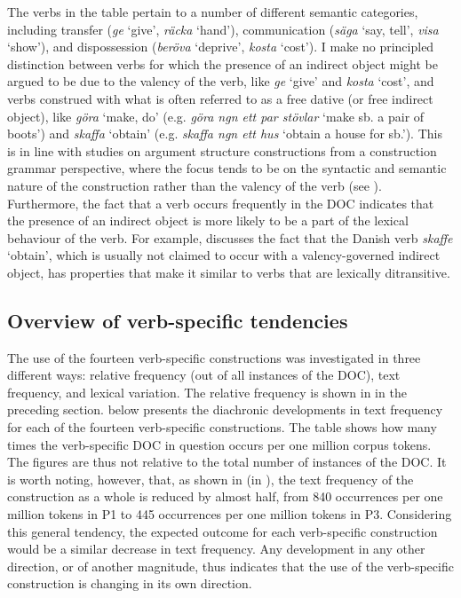 \documentclass[output=paper]{langscibook}
\begin{document}
The verbs in the table pertain to a number of different semantic categories, including transfer (\textit{ge} ‘give’, \textit{räcka} ‘hand’), communication (\textit{säga} ‘say, tell’, \textit{visa} ‘show’), and dispossession (\textit{beröva} ‘deprive’, \textit{kosta} ‘cost’). I make no principled distinction between verbs for which the presence of an indirect object might be argued to be due to the valency of the verb, like \textit{ge} ‘give’ and \textit{kosta} ‘cost’, and verbs construed with what is often referred to as a free dative (or free indirect object), like \textit{göra} ‘make, do’ (e.g. \textit{göra ngn ett par stövlar} ‘make sb. a pair of boots’) and \textit{skaffa} ‘obtain’ (e.g. \textit{skaffa ngn ett hus} ‘obtain a house for sb.’). This is in line with studies on argument structure constructions from a construction grammar perspective, where the focus tends to be on the syntactic and semantic nature of the construction rather than the valency of the verb (see \citealt{Goldberg1995}). Furthermore, the fact that a verb occurs frequently in the DOC indicates that the presence of an indirect object is more likely to be a part of the lexical behaviour of the verb. For example, \citet[150--151]{Nielsen2019} discusses the fact that the Danish verb \textit{skaffe} ‘obtain’, which is usually not claimed to occur with a valency-governed indirect object, has properties that make it similar to verbs that are lexically ditransitive.


\subsection{Overview of verb-specific tendencies}\label{sec:valdeson:5.2}


The use of the fourteen verb-specific constructions was investigated in three different ways: relative frequency (out of all instances of the DOC), text frequency, and lexical variation. The relative frequency is shown in  in the preceding section.  below presents the diachronic developments in text frequency for each of the fourteen verb-specific constructions. The table shows how many times the verb-specific DOC in question occurs per one million corpus tokens. The figures are thus not relative to the total number of instances of the DOC. It is worth noting, however, that, as shown in  (in ), the text frequency of the construction as a whole is reduced by almost half, from 840 occurrences per one million tokens in P1 to 445 occurrences per one million tokens in P3. Considering this general tendency, the expected outcome for each verb-specific construction would be a similar decrease in text frequency. Any development in any other direction, or of another magnitude, thus indicates that the use of the verb-specific construction is changing in its own direction.
\end{document}
